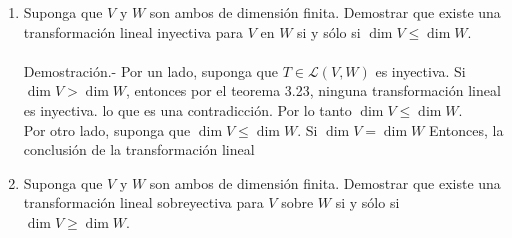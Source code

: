 \begin{enumerate}[\bfseries 1.]
    \item Suponga que $V$ y $W$ son ambos de dimensión finita. Demostrar que existe una transformación lineal inyectiva para $V$ en $W$ si y sólo si $\dim V \leq \dim W$.\\\\
	Demostración.-\; Por un lado, suponga que $T\in \mathcal{L}(V,W)$ es inyectiva. Si $\dim V>\dim W$, entonces por el teorema 3.23, ninguna transformación lineal es inyectiva. lo que es una contradicción. Por lo tanto $\dim V\leq \dim W$.\\
	Por otro lado, suponga que $\dim V\leq \dim W$. Si $\dim V=\dim W$ Entonces, la conclusión de la transformación lineal 


    \item Suponga que $V$ y $W$ son ambos de dimensión finita. Demostrar que existe una transformación lineal sobreyectiva para $V$ sobre $W$ si y sólo si $\dim V \geq \dim W$.\\\\

\end{enumerate}
